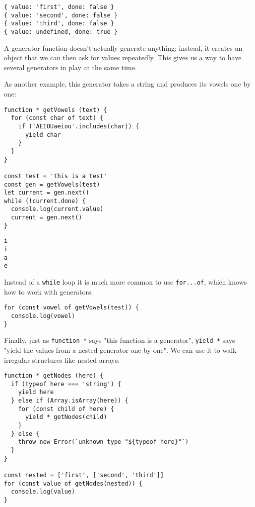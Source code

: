 \documentclass[krantzl]{krantz}
\begin{document}
\begin{lstlisting}[frame=single,frameround=tttt]
{ value: 'first', done: false }
{ value: 'second', done: false }
{ value: 'third', done: false }
{ value: undefined, done: true }
\end{lstlisting}



\noindent A generator function doesn't actually generate anything;
instead,
it creates an object that we can then ask for values repeatedly.
This gives us a way to have several generators in play at the same time.


As another example,
this generator takes a string and produces its vowels one by one:


\begin{lstlisting}[frame=single,frameround=tttt]
function * getVowels (text) {
  for (const char of text) {
    if ('AEIOUaeiou'.includes(char)) {
      yield char
    }
  }
}

const test = 'this is a test'
const gen = getVowels(test)
let current = gen.next()
while (!current.done) {
  console.log(current.value)
  current = gen.next()
}
\end{lstlisting}



\begin{lstlisting}[frame=single,frameround=tttt]
i
i
a
e
\end{lstlisting}



Instead of a \texttt{while} loop it is much more common to use \texttt{for...of},
which knows how to work with generators:


\begin{lstlisting}[frame=single,frameround=tttt]
for (const vowel of getVowels(test)) {
  console.log(vowel)
}
\end{lstlisting}



Finally,
just as \texttt{function *} says "this function is a generator",
\texttt{yield *} says "yield the values from a nested generator one by one".
We can use it to walk irregular structures like nested arrays:


\begin{lstlisting}[frame=single,frameround=tttt]
function * getNodes (here) {
  if (typeof here === 'string') {
    yield here
  } else if (Array.isArray(here)) {
    for (const child of here) {
      yield * getNodes(child)
    }
  } else {
    throw new Error(`unknown type "${typeof here}"`)
  }
}

const nested = ['first', ['second', 'third']]
for (const value of getNodes(nested)) {
  console.log(value)
}
\end{lstlisting}
\end{document}
